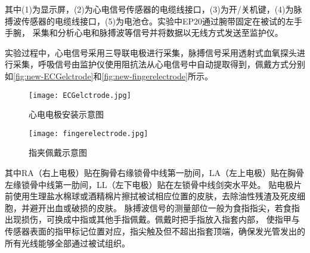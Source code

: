 其中(1)为显示屏，(2)为心电信号传感器的电缆线接口，(3)为开/关机键，(4)为脉搏波传感器的电缆线接口，(5)为电池仓。实验中EP20通过腕带固定在被试的左手手腕，
采集和分析心电和脉搏波等信号并将数据以无线方式发送至监护仪。

实验过程中，心电信号采用三导联电极进行采集，脉搏信号采用透射式血氧探头进行采集，呼吸信号由监护仪使用阻抗法从心电信号中自动提取得到，佩戴方式分别如\autoref{fig:new-ECGelctrode}和\autoref{fig:new-fingerelectrode}所示。

\begin{figure}[htbp]
    \hspace {0.4cm}
    \centering
    \begin{minipage}[l]{0.30\textwidth}
        \centering
        \texttt{[image: ECGelctrode.jpg]}
        \caption[心电电极安装示意图]{心电电极安装示意图}
        \label{fig:new-ECGelctrode}
    \end{minipage}
    \hspace{.65in}
    \begin{minipage}[c]{0.4\textwidth}
        \hspace {-1cm}
        \centering
        \vspace{-1.5em}
        \setlength{\abovecaptionskip}{3em}
        \texttt{[image: fingerelectrode.jpg]}
        \caption[指夹佩戴示意图]{指夹佩戴示意图$\qquad$ $\qquad$ $\quad$ }
        \label{fig:new-fingerelectrode}
    \end{minipage}
\end{figure}

其中RA（右上电极）贴在胸骨右缘锁骨中线第一肋间，LA（左上电极）贴在胸骨左缘锁骨中线第一肋间，LL（左下电极）贴在左锁骨中线剑突水平处。
贴电极片前使用生理盐水棉球或酒精棉片擦拭被试相应位置的皮肤，去除油性残渣及死皮细胞，并避开出血或破损的皮肤。
脉搏波信号的测量部位一般为食指指尖，若食指出现损伤，可换成中指或其他手指佩戴。佩戴时把手指放入指套内部，
使指甲与传感器表面的指甲标记位置对应，指尖触及但不超出指套顶端，确保发光管发出的所有光线能够全部通过被试组织。


